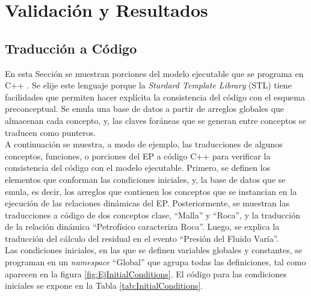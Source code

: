 \chapter{Validación y Resultados}\label{cap:Validacion}

\section{Traducción a Código}
En esta Sección se muestran porciones del modelo ejecutable que se programa en C++ \citep{ISO:2017:IIIa}. Se elije este lenguaje porque la \textit{Stardard Template Library} (STL) tiene facilidades que permiten hacer explícita la consistencia del código con el esquema preconceptual. Se emula una base de datos a partir de arreglos globales que almacenan cada concepto, y, las claves foráneas que se generan entre conceptos se traducen como punteros. \\

A continuación se muestra, a modo de ejemplo, las traducciones de algunos conceptos, funciones, o porciones del EP a código C++ para verificar la consistencia del código con el modelo ejecutable. Primero, se definen los elementos que conforman las condiciones iniciales, y, la base de datos que se emula, es decir, los arreglos que contienen los conceptos que se instancian en la ejecución de las relaciones dinámicas del EP. Posteriormente, se muestran las traducciones a código de dos conceptos clase, ``Malla'' y ``Roca'', y la traducción de la relación dinámica ``Petrofísico caracteriza Roca''. Luego, se explica la traducción del cálculo del residual en el evento ``Presión del Fluido Varía''.\\

Las condiciones iniciales, en las que se definen variables globales y constantes, se programan en un \textit{namespace} ``Global'' que agrupa todas las definiciones, tal como aparecen en la figura \ref{fig:EjInitialConditions}. El código para las condiciones iniciales se expone en la Tabla \ref{tab:InitialConditions}.\\

